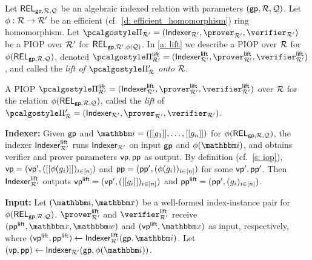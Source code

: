 \documentclass[11pt,letterpaper,usenames,dvipsnames]{article}
\begin{document}
        \begin{definition} \label{d: Lift of an Algebraic PIOP}
     Let $\mathsf{REL}_{\mathsf{gp},\mathcal{R},\mathcal{Q}}$ be an algebraic indexed relation with parameters $(\mathsf{gp}, \mathcal{R},\mathcal{Q})$. Let $\phi:\mathcal{R} \to \mathcal{R}'$ be an efficient (cf.\ \cref{d: efficient_homomorphism}) ring homomorphism.  Let $\prot_{\R'}=( \indexer_{\R'}, \prover_{\R'},\verifier_{\R'})$ be a PIOP over $\mathcal{R}'$ for $\mathsf{REL}_{\mathsf{gp},\mathcal{R}',\phi(\mathcal{Q})}$. In \cref{a: lift} we describe a PIOP over $\mathcal{R}$ for $\phi(\mathsf{REL}_{\mathsf{gp},\mathcal{R}, \mathcal{Q}})$, denoted $\prot_{\R'}^{\lift}= (\indexer_{\R'}^\lift, \prover_{\R'}^\lift,\verifier_{\R'}^\lift)$, and called the \emph{lift of $\prot_\R'$ onto $\mathcal{R}$}. 

        	\begin{algorithm}[H]
		\caption{A PIOP $\prot_{\R'}^{\lift}=(\indexer_{\R'}^\lift,\prover_{\R'}^\lift, \verifier_{\R'}^\lift)$ over $\mathcal{R}$ for the relation $ \phi(\mathsf{REL}_{\mathsf{gp}, \mathcal{R},\mathcal{Q}})$, called the \emph{lift} of $\prot_\R'=(\indexer_{\R'},\prover_{\R'}, \verifier_{\R'})$. \label{a: lift}}%
		            
        \textbf{Indexer:}      Given $\mathsf{gp}$ and $\idx=(\oracle{g_1},\ldots, \oracle{g_n})$ for $\phi(\mathsf{REL}_{\mathsf{gp},\mathcal{R}, \mathcal{Q}})$, the indexer $\mathsf{Indexer}_{\mathcal{R}'}^{\mathsf{lift}}$ runs $\mathsf{Indexer}_{\mathcal{R}'}$ on input $\mathsf{gp}$ and $\phi(\idx)$, and obtains verifier and prover parameters $\mathsf{vp}, \mathsf{pp}$ as output. By definition (cf.\ \cref{s: iop}), $\mathsf{vp}=(\mathsf{vp}', ([[{\phi(g_i)}]])_{i\in [n]})$ and $\mathsf{pp}=(\mathsf{pp}', (\phi(g_i))_{i\in [n]})$ for some $\mathsf{vp}', \mathsf{pp}'$. Then  $\mathsf{Indexer}_{\mathcal{R}'}^{\mathsf{lift}}$ outputs $\mathsf{vp}^{\mathsf{lift}} = (\mathsf{vp}', ([[{g_i}]])_{i\in [n]})$ and $\mathsf{pp}^{\mathsf{lift}} = (\mathsf{pp}', (g_i)_{i\in [n]})$.
        \vspace{0.3cm}
        
        	\textbf{Input:} Let $(\idx,\inp)$ be a well-formed index-instance pair for $\phi(\mathsf{REL}_{\mathsf{gp},\mathcal{R}, \mathcal{Q}})$. $\prover_{\R'}^\lift$ and $\verifier_{\R'}^\lift$ receive $(\pp^\lift, \inp,\wit)$   and $(\vp^\lift, \inp)$ as input, respectively, where $(\vp^\lift, \pp^\lift) \gets \indexer_{\R'}^\lift(\gparams,\idx)$. Let  $(\vp, \pp) \gets \indexer_{\R'}(\gparams,\phi(\idx))$.\vspace{0.3cm}%


\end{algorithm}
\end{definition}
\end{document}

